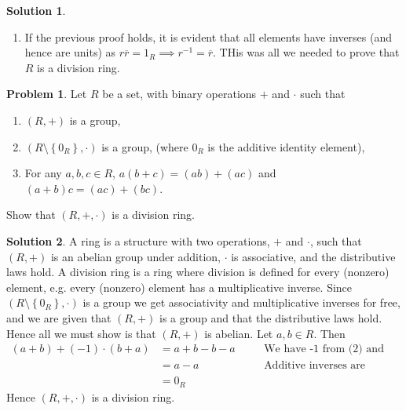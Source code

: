\documentclass[10pt]{article}
\theoremstyle{definition}
\newtheorem{problem}{Problem}
\newtheorem{soln}{Solution}
\newcommand{\justif}[2]{&{#1}&\text{#2}}
\begin{document}
\begin{soln}
\begin{enumerate}[label=(\alph*)]
          and we cancel the right $r$ to obtain that $x r\overline{r}=x$. We also have that $\overline{r}r\overline{r}=\overline{r}$ and, in similar fashion,
          $\overline{r}r\overline{r}=\overline{r}\implies \overline{r}r\overline{r}x=\overline{r}x\implies r\overline{r}x=x$ so
          $r\overline{r}x=xr\overline{r}=x$, hence $r\overline{r}=1_R$. This was troubling for a while until I realised that it's fine (I think), because,
          though $r\overline{r}$ is not unique, that is no problem as for any such combination we arrive at the same identity.
    \item If the previous proof holds, it is evident that all elements have inverses (and hence are units) as $r\overline{r}=1_R \implies r^{-1}=\overline{r}$. THis
          was all we needed to prove that $R$ is a division ring.
  \end{enumerate}
\end{soln}

\begin{problem}
Let $R$ be a set, with binary operations $+$ and $\cdot$ such that
\begin{enumerate}[label=(\arabic*)]
  \item $(R, +)$ is a group,
  \item $(R \setminus \left\{0_R\right\}, \cdot)$ is a group, (where $0_R$ is the additive identity element),
  \item For any $a, b, c \in R$, $a(b + c) = (ab) + (ac)$ and $(a + b)c =
          (ac) + (bc)$.
\end{enumerate}
Show that $(R, +, \cdot)$ is a division ring.
\end{problem}
\begin{soln}
  A ring is a structure with two operations, $+$ and $\cdot$, such that $(R,+)$ is an abelian group under addition, $\cdot$ is associative, and the distributive laws
  hold. A division ring is a ring where division is defined for every (nonzero) element, e.g. every (nonzero) element has a multiplicative inverse. Since $(R\setminus \left\{0_R\right\},\cdot)$ is a group
  we get associativity and multiplicative inverses for free, and we are given that $(R,+)$ is a group and that the distributive laws hold. Hence all we must show is that $(R,+)$ is abelian.
  Let $a,b\in R$. Then
  \begin{align*}
    (a+b)+(-1)\cdot(b+a) & =a+b-b-a \justif{\quad}{We have -1 from (2) and distributive law from (3)} \\
                         & =a-a\justif{\quad}{Additive inverses are defined from (1)}                 \\
                         & =0_R
  \end{align*}
  Hence $(R, +, \cdot)$ is a division ring.
\end{soln}
\end{document}
